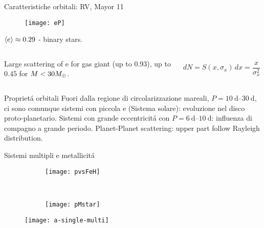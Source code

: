 \begin{frame}{Caratteristiche orbitali: RV, Mayor 11}
\begin{figure}[!ht]\texttt{[image: eP]}\label{fig:eP}\end{figure}
$\langle e \rangle\approx0.29$ - binary stars.

\begin{columns}[T]\begin{column}{0.5\textwidth}
Large scattering of e for gas giant (up to 0.93), up to $0.45$ for $M<30M_{\oplus}{}$.
\end{column} \begin{column}{0.5\textwidth}
\begin{equation*}
dN=S(x,\sigma_x)\,dx=\frac{x}{\sigma_x^2}\exp{-\frac{x^2}{2\sigma_x^2}} 
\end{equation*}
\end{column}  \end{columns}

\end{frame}

\begin{wordonframe}{Propriet\'a orbitali}
Fuori dalla regione di circolarizzazione mareali, $P=\SIrange{10}{30}{\day}$, ci sono comunque sistemi con piccola e (Sistema solare): evoluzione nel disco proto-planetario.
Sistemi con grande eccentricit\'a con $P=\SIrange{6}{10}{\day}$: influenza di compagno a grande periodo.
Planet-Planet scattering: upper part follow Rayleigh distribution.
\end{wordonframe}

\begin{frame}{Sistemi multipli e metallicit\'a}

\begin{figure}[!ht]
\begin{subfigure}[b]{0.47\textwidth} \centering \texttt{[image: pvsFeH]}\label{fig:pvsFeH} \end{subfigure}
~
\begin{subfigure}[b]{0.47\textwidth} \centering \texttt{[image: pMstar]}\label{fig:pMstar}\end{subfigure}
\end{figure}
\begin{figure}[!ht]
\texttt{[image: a-single-multi]}\label{fig:a-single-multi}\end{figure}
\end{frame}

